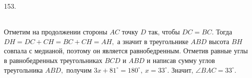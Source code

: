 153. \begin{figure}[ht!]
\end{figure}\\
Отметим на продолжении стороны $AC$ точку $D$ так, чтобы $DC=BC.$ Тогда $DH=DC+CH=BC+CH=AH,$ а значит в треугольнике $ABD$ высота $BH$ совпала с медианой, поэтому он является равнобедренным. Отметив равные углы в равнобедренных треугольниках $BCD$ и $ABD$ и написав сумму углов треугольника $ABD,$ получим $3x+81^\circ=180^\circ,\ x=33^\circ.$ Значит, $\angle BAC=33^\circ.$\\
